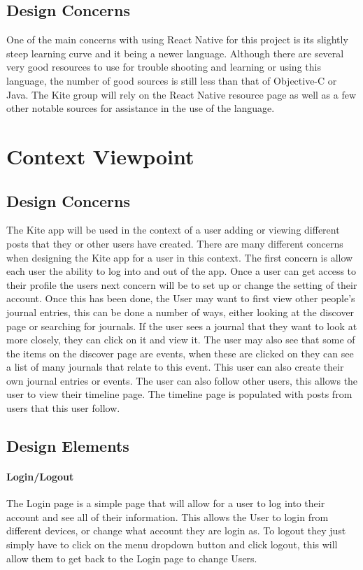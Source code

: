\documentclass[compsoc, 10, draftclsnofoot, onecolumn]{IEEEtran}
\begin{document}
\subsection{Design Concerns} One of the main concerns with using React Native for this project is its slightly steep learning curve and it being a newer language. Although there are several very good resources to use for trouble shooting and learning or using this language, the number of good sources is still less than that of Objective-C or Java. The Kite group will rely on the React Native resource page as well as a few other notable sources for assistance in the use of the language. 

\section{Context Viewpoint}
\subsection*{Design Concerns}
The Kite app will be used in the context of a user adding or viewing different posts that they or other users have created. There are many different concerns when designing the Kite app for a user in this context. The first concern is allow each user the ability to log into and out of the app. Once a user can get access to their profile the users next concern will be to set up or change the setting of their account. Once this has been done, the User may want to first view other people's journal entries, this can be done a number of ways, either looking at the discover page or searching for journals. If the user sees a journal that they want to look at more closely, they can click on it and view it. The user may also see that some of the items on the discover page are events, when these are clicked on they can see a list of many journals that relate to this event. This user can also create their own journal entries or events. The user can also follow other users, this allows the user to view their timeline page. The timeline page is populated with posts from users that this user follow.

\subsection*{Design Elements}
\paragraph*{Login/Logout}
The Login page is a simple page that will allow for a user to log into their account and see all of their information. This allows the User to login from different devices, or change what account they are login as. To logout they just simply have to click on the menu dropdown button and click logout, this will allow them to get back to the Login page to change Users.
\end{document}
